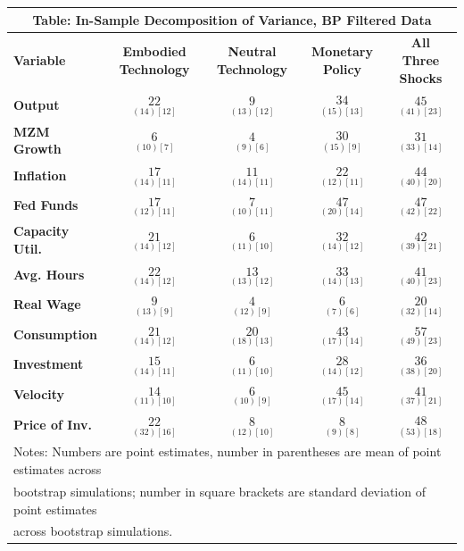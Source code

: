 \documentclass{article}
\begin{document}
 \begin{tabular}{|l|c|@{}c|c|@{}c|} 
 \hline 
 \multicolumn{5}{|c|}{\textbf{Table: In-Sample Decomposition of Variance, BP Filtered Data}} \\ \hline 
 \textbf{Variable} & \textbf{Embodied Technology} & \textbf{Neutral Technology} & \textbf{%
 Monetary Policy} & \textbf{All Three Shocks} \\ \hline\hline 
 \textbf{Output} & $\underset{( 14)[ 12]}{ 22}$ & $\underset{( 13)[ 12]}{  9}$ & $\underset{( 15)[ 13]}{ 34}$ & $\underset{( 41)[ 23]}{ 45}$ \\ \hline 
 \textbf{MZM Growth} & $\underset{( 10)[  7]}{  6}$ & $\underset{(  9)[  6]}{  4}$ & $\underset{( 15)[  9]}{ 30}$ & $\underset{( 33)[ 14]}{ 31}$ \\ \hline 
 \textbf{Inflation} & $\underset{( 14)[ 11]}{ 17}$ & $\underset{( 14)[ 11]}{ 11}$ & $\underset{( 12)[ 11]}{ 22}$ & $\underset{( 40)[ 20]}{ 44}$ \\ \hline 
 \textbf{Fed Funds} & $\underset{( 12)[ 11]}{ 17}$ & $\underset{( 10)[ 11]}{  7}$ & $\underset{( 20)[ 14]}{ 47}$ & $\underset{( 42)[ 22]}{ 47}$ \\ \hline 
 \textbf{Capacity Util.} & $\underset{( 14)[ 12]}{ 21}$ & $\underset{( 11)[ 10]}{  6}$ & $\underset{( 14)[ 12]}{ 32}$ & $\underset{( 39)[ 21]}{ 42}$ \\ \hline 
 \textbf{Avg. Hours} & $\underset{( 14)[ 12]}{ 22}$ & $\underset{( 13)[ 12]}{ 13}$ & $\underset{( 14)[ 13]}{ 33}$ & $\underset{( 40)[ 23]}{ 41}$ \\ \hline 
 \textbf{Real Wage} & $\underset{( 13)[  9]}{  9}$ & $\underset{( 12)[  9]}{  4}$ & $\underset{(  7)[  6]}{  6}$ & $\underset{( 32)[ 14]}{ 20}$ \\ \hline 
 \textbf{Consumption} & $\underset{( 14)[ 12]}{ 21}$ & $\underset{( 18)[ 13]}{ 20}$ & $\underset{( 17)[ 14]}{ 43}$ & $\underset{( 49)[ 23]}{ 57}$ \\ \hline 
 \textbf{Investment} & $\underset{( 14)[ 11]}{ 15}$ & $\underset{( 11)[ 10]}{  6}$ & $\underset{( 14)[ 12]}{ 28}$ & $\underset{( 38)[ 20]}{ 36}$ \\ \hline 
 \textbf{Velocity} & $\underset{( 11)[ 10]}{ 14}$ & $\underset{( 10)[  9]}{  6}$ & $\underset{( 17)[ 14]}{ 45}$ & $\underset{( 37)[ 21]}{ 41}$ \\ \hline 
 \textbf{Price of Inv.} & $\underset{( 32)[ 16]}{ 22}$ & $\underset{( 12)[ 10]}{  8}  $ & $\underset{(  9)[  8]}{  8}$ & $\underset{( 53)[ 18]}{ 48}$ \\ \hline 
 \multicolumn{5}{|l|}{Notes: Numbers are point estimates, number in 
 parentheses are mean of point estimates across} \\ \hline 
 \multicolumn{5}{|l|}{bootstrap simulations; number in square brackets are 
 standard deviation of point estimates} \\ \hline 
 \multicolumn{5}{|l|}{across bootstrap simulations.} \\ \hline 
 \end{tabular} 
\end{document}
